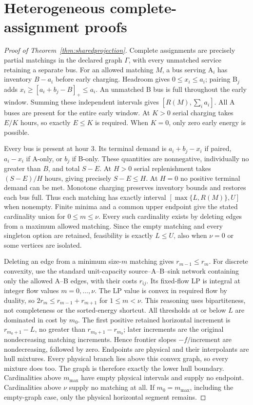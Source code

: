 \section{Heterogeneous complete-assignment proofs}\label{app:heterogeneous}
\begin{proof}[Proof of Theorem~\ref{thm:sharedprojection}]
Complete assignments are precisely partial matchings in the declared graph
$\Gamma$, with every unmatched service retaining a separate bus. For an
allowed matching $M$, a bus serving A$_i$ has inventory $B-a_i$ before
early charging. Headroom gives $0\le x_i\le a_i$; pairing B$_j$
adds $x_i\ge[a_i+b_j-B]_+\le a_i$. An unmatched B bus is full
throughout the early window. Summing these independent intervals gives
$[R(M),\sum_i a_i]$. All A buses are present for the entire early
window. At $K>0$ serial charging takes $E/K$ hours, so exactly
$E\le K$ is required. When $K=0$, only zero early energy is possible.

Every bus is present at hour 3. Its terminal demand is $a_i+b_j-x_i$
if paired, $a_i-x_i$ if A-only, or $b_j$ if B-only. These quantities
are nonnegative, individually no greater than $B$, and total $S-E$.
At $H>0$ serial replenishment takes $(S-E)/H$ hours, giving precisely
$S-E\le H$. At $H=0$ no positive terminal demand can be met.
Monotone charging preserves inventory bounds and restores each bus full.
Thus each matching has exactly interval $[\max\{L,R(M)\},U]$ when
nonempty. Finite minima and a common upper endpoint give the stated
cardinality union for $0\le m\le\nu$. Every such cardinality exists by
deleting edges from a maximum allowed matching. Since the empty matching
and every singleton option are retained, feasibility is exactly $L\le U$,
also when $\nu=0$ or some vertices are isolated.

Deleting an edge from a minimum size-$m$ matching gives
$r_{m-1}\le r_m$. For discrete convexity, use the standard unit-capacity
source--A--B--sink network containing only the allowed A--B edges, with
their costs $r_{ij}$. Its fixed-flow LP is integral at integer flow values
$m=0,\ldots,\nu$. The LP value is convex in required flow by duality,
so $2r_m\le r_{m-1}+r_{m+1}$ for $1\le m<\nu$. This reasoning
uses bipartiteness, not completeness or the sorted-energy shortcut.
All thresholds at or below $L$ are dominated
in cost by $m_0$. The first positive retained horizontal increment is
$r_{m_0+1}-L$, no greater than $r_{m_0+1}-r_{m_0}$; later increments
are the original nondecreasing matching increments. Hence frontier slopes
$-f/\text{increment}$ are nondecreasing, followed by zero. Endpoints are
physical and their interpolants are hull mixtures. Every physical branch
lies above this convex graph, so every mixture does too. The graph is
therefore exactly the lower hull boundary. Cardinalities above $m_{\max}$
have empty physical intervals and supply no endpoint. Cardinalities above
$\nu$ supply no matching at all. If $m_0=m_{\max}$, including the
empty-graph case, only the physical horizontal segment remains.
\end{proof}

